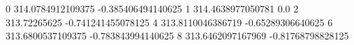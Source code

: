 0 314.0784912109375 -0.385406494140625
1 314.4638977050781 0.0
2 313.72265625 -0.741241455078125
4 313.8110046386719 -0.65289306640625
6 313.6800537109375 -0.783843994140625
8 313.6462097167969 -0.81768798828125
